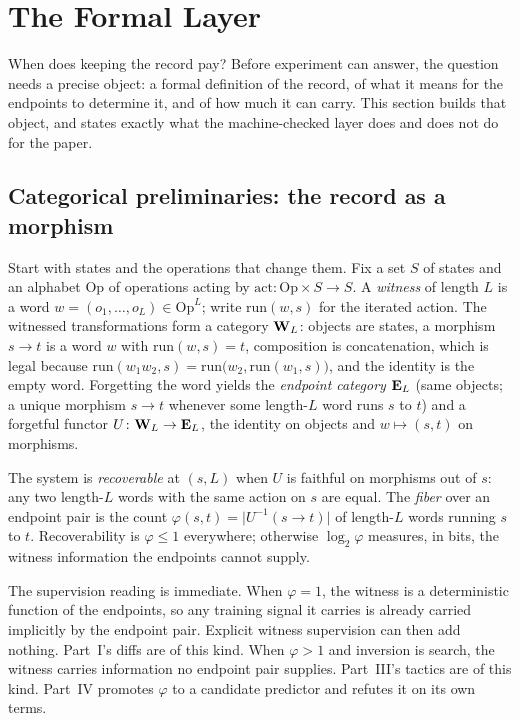 \section{The Formal Layer}\label{sec:formal}

When does keeping the record pay? Before experiment can answer, the question needs a precise object: a formal definition of the record, of what it means for the endpoints to determine it, and of how much it can carry. This section builds that object, and states exactly what the machine-checked layer does and does not do for the paper.

\subsection{Categorical preliminaries: the record as a morphism}\label{sec:prelim}

Start with states and the operations that change them. Fix a set $S$ of states and an alphabet $\mathrm{Op}$ of operations acting by $\mathrm{act}\colon \mathrm{Op}\times S\to S$. A \emph{witness} of length $L$ is a word $w=(o_1,\dots,o_L)\in\mathrm{Op}^L$; write $\mathrm{run}(w,s)$ for the iterated action. The witnessed transformations form a category $\mathbf{W}_L$: objects are states, a morphism $s\to t$ is a word $w$ with $\mathrm{run}(w,s)=t$, composition is concatenation, which is legal because $\mathrm{run}(w_1 w_2, s)=\mathrm{run}\!\bigl(w_2,\mathrm{run}(w_1,s)\bigr)$, and the identity is the empty word. Forgetting the word yields the \emph{endpoint category} $\mathbf{E}_L$ (same objects; a unique morphism $s\to t$ whenever some length-$L$ word runs $s$ to $t$) and a forgetful functor $U\colon \mathbf{W}_L\to\mathbf{E}_L$, the identity on objects and $w\mapsto(s,t)$ on morphisms.

\begin{definition}\label{def:fiber}
The system is \emph{recoverable} at $(s,L)$ when $U$ is faithful on morphisms out of $s$: any two length-$L$ words with the same action on $s$ are equal. The \emph{fiber} over an endpoint pair is the count $\varphi(s,t)=\bigl|U^{-1}(s\!\to\!t)\bigr|$ of length-$L$ words running $s$ to $t$. Recoverability is $\varphi\leq 1$ everywhere; otherwise $\log_2\varphi$ measures, in bits, the witness information the endpoints cannot supply.
\end{definition}

The supervision reading is immediate. When $\varphi=1$, the witness is a deterministic function of the endpoints, so any training signal it carries is already carried implicitly by the endpoint pair. Explicit witness supervision can then add nothing. Part~I's diffs are of this kind. When $\varphi>1$ and inversion is search, the witness carries information no endpoint pair supplies. Part~III's tactics are of this kind. Part~IV promotes $\varphi$ to a candidate predictor and refutes it on its own terms.

